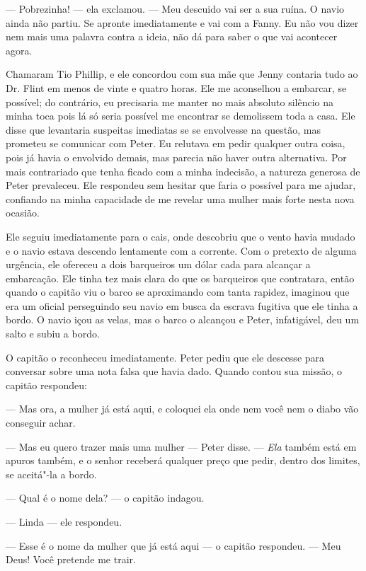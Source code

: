 --- Pobrezinha! --- ela exclamou. --- Meu descuido vai ser a sua ruína.
O navio ainda não partiu. Se apronte imediatamente e vai com a Fanny. Eu
não vou dizer nem mais uma palavra contra a ideia, não dá para saber o
que vai acontecer agora.

Chamaram Tio Phillip, e ele concordou
com sua mãe que Jenny contaria tudo ao Dr. Flint em menos de vinte e
quatro horas. Ele me aconselhou a embarcar, se possível; do contrário,
eu precisaria me manter no mais absoluto silêncio na minha toca pois lá
só seria possível me encontrar se demolissem toda a casa. Ele disse que
levantaria suspeitas imediatas se se envolvesse na questão, mas prometeu
se comunicar com Peter. Eu relutava em pedir qualquer outra coisa, pois
já havia o envolvido demais, mas parecia não haver outra alternativa.
Por mais contrariado que tenha ficado com a minha indecisão, a natureza
generosa de Peter prevaleceu. Ele respondeu sem hesitar que faria o
possível para me ajudar, confiando na minha capacidade de me revelar uma
mulher mais forte nesta nova ocasião.

Ele seguiu imediatamente para o cais,
onde descobriu que o vento havia mudado e o navio estava descendo
lentamente com a corrente. Com o pretexto de alguma urgência, ele
ofereceu a dois barqueiros um dólar cada para alcançar a embarcação. Ele
tinha tez mais clara do que os barqueiros que contratara, então quando o
capitão viu o barco se aproximando com tanta rapidez, imaginou que era
um oficial perseguindo seu navio em busca da escrava fugitiva que ele
tinha a bordo. O navio içou as velas, mas o barco o alcançou e Peter,
infatigável, deu um salto e subiu a bordo.

O capitão o reconheceu imediatamente.
Peter pediu que ele descesse para conversar sobre uma nota falsa que
havia dado. Quando contou sua missão, o capitão respondeu:

--- Mas ora, a mulher já está aqui, e coloquei ela onde nem você nem o
diabo vão conseguir achar.

--- Mas eu quero trazer mais uma mulher
--- Peter disse. --- \emph{Ela} também está em apuros também, e o senhor
receberá qualquer preço que pedir, dentro dos limites, se aceitá"-la a
bordo.

--- Qual é o nome dela? --- o capitão
indagou.

--- Linda --- ele respondeu.

--- Esse é o nome da mulher que já está
aqui --- o capitão respondeu. --- Meu Deus! Você pretende me trair.

